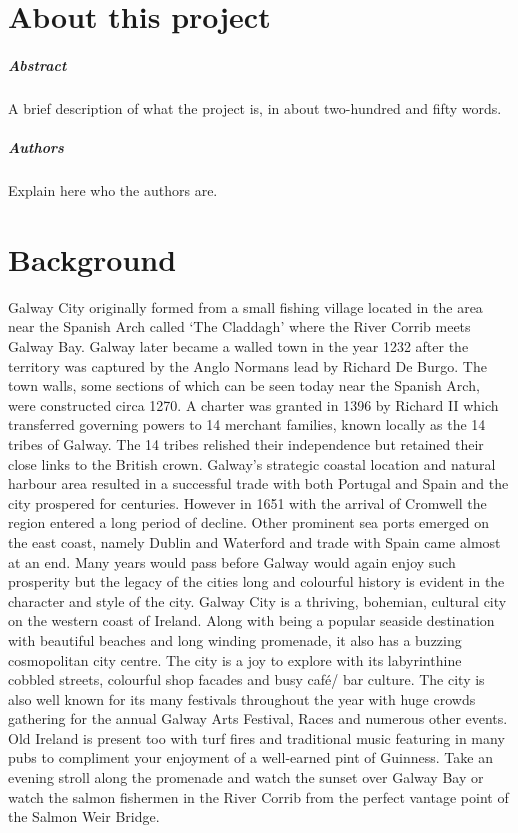 
\chapter*{About this project}
\paragraph{Abstract}
A brief description of what the project is, in about two-hundred and fifty words.

\paragraph{Authors}
Explain here who the authors are.

\chapter{Background}
 \cite{galwayTourism} Galway City originally formed from a small fishing village located in the area near the Spanish Arch called ‘The Claddagh’ where the River Corrib meets Galway Bay. Galway later became a walled town in the year 1232 after the territory was captured by the Anglo Normans lead by Richard De Burgo. The town walls, some sections of which can be seen today near the Spanish Arch, were constructed circa 1270. A charter was granted in 1396 by Richard II which transferred governing powers to 14 merchant families, known locally as the 14 tribes of Galway. 
 The 14 tribes relished their independence but retained their close links to the British crown. Galway's strategic coastal location and natural harbour area resulted in a successful trade with both Portugal and Spain and the city prospered for centuries. However in 1651 with the arrival of Cromwell the region entered a long period of decline. Other prominent sea ports emerged on the east coast, namely Dublin and Waterford and trade with Spain came almost at an end. Many years would pass before Galway would again enjoy such prosperity but the legacy of the cities long and colourful history is evident in the character and style of the city. 
 Galway City is a thriving, bohemian, cultural city on the western coast of Ireland. Along with being a popular seaside destination with beautiful beaches and long winding promenade, it also has a buzzing cosmopolitan city centre. The city is a joy to explore with its labyrinthine cobbled streets, colourful shop facades and busy café/ bar culture.  The city is also well known for its many festivals throughout the year with huge crowds gathering for the annual Galway Arts Festival, Races and numerous other events. Old Ireland is present too with turf fires and traditional music featuring in many pubs to compliment your enjoyment of a well-earned pint of Guinness. Take an evening stroll along the promenade and watch the sunset over Galway Bay or watch the salmon fishermen in the River Corrib from the perfect vantage point of the Salmon Weir Bridge.
